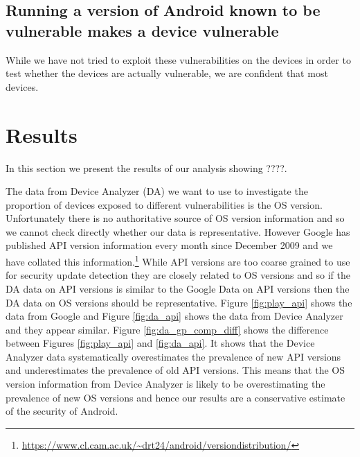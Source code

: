 \documentclass[conference,a4paper,twoside]{IEEEtran}
\begin{document}
\subsection{Running a version of Android known to be vulnerable makes a device vulnerable}
While we have not tried to exploit these vulnerabilities on the devices in order to test whether the devices are actually vulnerable, we are confident that most devices.

\section{Results}
\label{sec:results}
In this section we present the results of our analysis showing ????. %

The data from Device Analyzer (DA) we want to use to investigate the proportion of devices exposed to different vulnerabilities is the OS version.
Unfortunately there is no authoritative source of OS version information and so we cannot check directly whether our data is representative.
However Google has published API version information every month since December 2009 and we have collated this information.\footnote{\url{https://www.cl.cam.ac.uk/~drt24/android/versiondistribution/}}
While API versions are too coarse grained to use for security update detection they are closely related to OS versions and so if the DA data on API versions is similar to the Google Data on API versions then the DA data on OS versions should be representative.
Figure \ref{fig:play_api} shows the data from Google and Figure \ref{fig:da_api} shows the data from Device Analyzer and they appear similar.
Figure \ref{fig:da_gp_comp_diff} shows the difference between Figures \ref{fig:play_api} and \ref{fig:da_api}.
It shows that the Device Analyzer data systematically overestimates the prevalence of new API versions and underestimates the prevalence of old API versions.
This means that the OS version information from Device Analyzer is likely to be overestimating the prevalence of new OS versions and hence our results are a conservative estimate of the security of Android.
\end{document}
